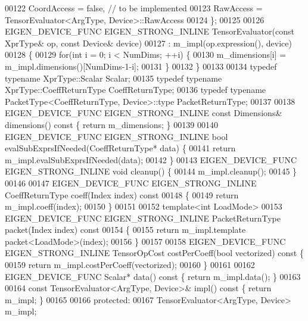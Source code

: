 \begin{DoxyCode}
00122     CoordAccess = \textcolor{keyword}{false},  \textcolor{comment}{// to be implemented}
00123     RawAccess = TensorEvaluator<ArgType, Device>::RawAccess
00124   \};
00125 
00126   EIGEN\_DEVICE\_FUNC EIGEN\_STRONG\_INLINE TensorEvaluator(\textcolor{keyword}{const} XprType& op, \textcolor{keyword}{const} Device& device)
00127       : m\_impl(op.expression(), device)
00128   \{
00129     \textcolor{keywordflow}{for}(\textcolor{keywordtype}{int} i = 0; i < NumDims; ++i) \{
00130       m\_dimensions[i] = m\_impl.dimensions()[NumDims-1-i];
00131     \}
00132   \}
00133 
00134   \textcolor{keyword}{typedef} \textcolor{keyword}{typename} XprType::Scalar Scalar;
00135   \textcolor{keyword}{typedef} \textcolor{keyword}{typename} XprType::CoeffReturnType CoeffReturnType;
00136   \textcolor{keyword}{typedef} \textcolor{keyword}{typename} PacketType<CoeffReturnType, Device>::type PacketReturnType;
00137 
00138   EIGEN\_DEVICE\_FUNC EIGEN\_STRONG\_INLINE \textcolor{keyword}{const} Dimensions& dimensions()\textcolor{keyword}{ const }\{ \textcolor{keywordflow}{return} m\_dimensions; \}
00139 
00140   EIGEN\_DEVICE\_FUNC EIGEN\_STRONG\_INLINE \textcolor{keywordtype}{bool} evalSubExprsIfNeeded(CoeffReturnType* data) \{
00141     \textcolor{keywordflow}{return} m\_impl.evalSubExprsIfNeeded(data);
00142   \}
00143   EIGEN\_DEVICE\_FUNC EIGEN\_STRONG\_INLINE \textcolor{keywordtype}{void} cleanup() \{
00144     m\_impl.cleanup();
00145   \}
00146 
00147   EIGEN\_DEVICE\_FUNC EIGEN\_STRONG\_INLINE CoeffReturnType coeff(Index index)\textcolor{keyword}{ const}
00148 \textcolor{keyword}{  }\{
00149     \textcolor{keywordflow}{return} m\_impl.coeff(index);
00150   \}
00151 
00152   \textcolor{keyword}{template}<\textcolor{keywordtype}{int} LoadMode>
00153   EIGEN\_DEVICE\_FUNC EIGEN\_STRONG\_INLINE PacketReturnType packet(Index index)\textcolor{keyword}{ const}
00154 \textcolor{keyword}{  }\{
00155     \textcolor{keywordflow}{return} m\_impl.template packet<LoadMode>(index);
00156   \}
00157 
00158   EIGEN\_DEVICE\_FUNC EIGEN\_STRONG\_INLINE TensorOpCost costPerCoeff(\textcolor{keywordtype}{bool} vectorized)\textcolor{keyword}{ const }\{
00159     \textcolor{keywordflow}{return} m\_impl.costPerCoeff(vectorized);
00160   \}
00161 
00162   EIGEN\_DEVICE\_FUNC Scalar* data()\textcolor{keyword}{ const }\{ \textcolor{keywordflow}{return} m\_impl.data(); \}
00163 
00164   \textcolor{keyword}{const} TensorEvaluator<ArgType, Device>& impl()\textcolor{keyword}{ const }\{ \textcolor{keywordflow}{return} m\_impl; \}
00165 
00166  \textcolor{keyword}{protected}:
00167   TensorEvaluator<ArgType, Device> m\_impl;

\end{DoxyCode}
